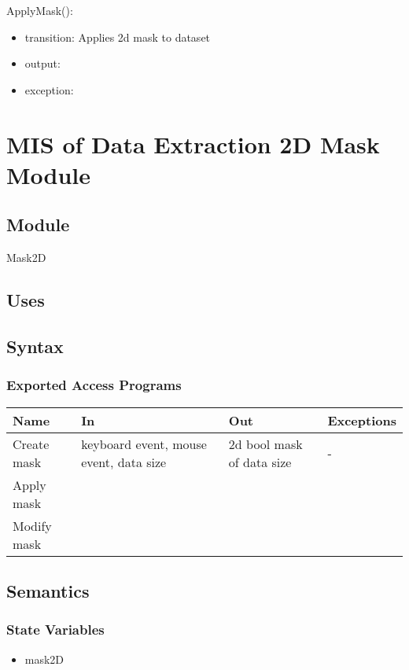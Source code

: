 \documentclass[12pt, titlepage]{article}
\begin{document}
\noindent ApplyMask():
\begin{itemize}
\item transition: Applies 2d mask to dataset
\item output:  
\item exception:  
\end{itemize}

\section{MIS of Data Extraction 2D Mask Module} \label{Mod:Mask2D}

\subsection{Module}

Mask2D

\subsection{Uses}


\subsection{Syntax}

\subsubsection{Exported Access Programs}

\begin{center}
\begin{tabular}{p{2cm} p{4cm} p{4cm} p{2cm}}
\hline
\textbf{Name} & \textbf{In} & \textbf{Out} & \textbf{Exceptions} \\
\hline
Create mask & keyboard event, mouse event, data size & 2d bool mask of data size & - \\
Apply mask & & & \\
Modify mask & & & \\

\hline
\end{tabular}
\end{center}

\subsection{Semantics}

\subsubsection{State Variables}
\begin{itemize}
\item mask2D
\end{itemize}
\end{document}
